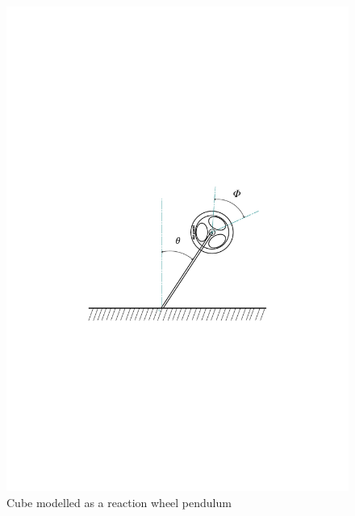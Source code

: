 \documentclass[a4paper,11pt]{kth-mag}
\begin{document}
\begin{figure}[!htb]
\centering
\includegraphics[trim=5cm 9cm 5cm 9cm, clip=true,scale=.6]{Lagrangeflywheel2.pdf}
\caption{Cube modelled as a reaction wheel pendulum }
\label{fig:Lagrangeflywheel}
\end{figure}
\end{document}
